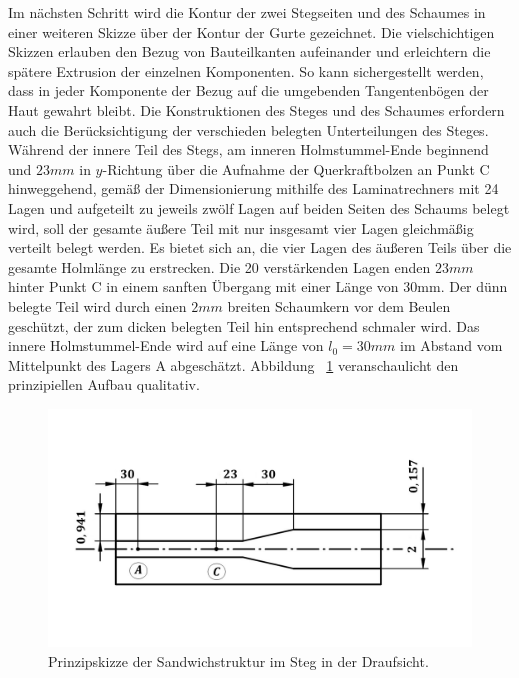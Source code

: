 \noindent Im nächsten Schritt wird die Kontur der zwei Stegseiten und des Schaumes in einer weiteren Skizze über der Kontur der Gurte gezeichnet. Die vielschichtigen Skizzen erlauben den Bezug von Bauteilkanten aufeinander und erleichtern die spätere Extrusion der einzelnen Komponenten. So kann sichergestellt werden, dass in jeder Komponente der Bezug auf die umgebenden Tangentenbögen der Haut gewahrt bleibt. Die Konstruktionen des Steges und des Schaumes erfordern auch die Berücksichtigung der verschieden belegten Unterteilungen des Steges. Während der innere Teil des Stegs, am inneren Holmstummel-Ende beginnend und $ 23mm $ in $y$-Richtung über die Aufnahme der Querkraftbolzen an Punkt C hinweggehend, gemäß der Dimensionierung mithilfe des Laminatrechners mit 24 Lagen und aufgeteilt zu jeweils zwölf Lagen auf beiden Seiten des Schaums belegt wird, soll der gesamte äußere Teil mit nur insgesamt vier Lagen gleichmäßig verteilt belegt werden. Es bietet sich an, die vier Lagen des äußeren Teils über die gesamte Holmlänge zu erstrecken. Die 20 verstärkenden Lagen enden $ 23mm $ hinter Punkt C in einem sanften Übergang mit einer Länge von 30mm. Der dünn belegte Teil wird durch einen $ 2mm $ breiten Schaumkern vor dem Beulen geschützt, der zum dicken belegten Teil hin entsprechend schmaler wird. Das innere Holmstummel-Ende wird auf eine Länge von $ l_{0}=30mm $ im Abstand vom Mittelpunkt des Lagers A abgeschätzt. Abbildung ~\ref{fig: Steg} veranschaulicht den prinzipiellen Aufbau qualitativ.\\

\begin{figure}[h]
	\includegraphics[width=1.0\textwidth]{Bilder/StegPrinzip.jpg}
	\caption{Prinzipskizze der Sandwichstruktur im Steg in der Draufsicht.}
	\label{fig: Steg}
\end{figure}


